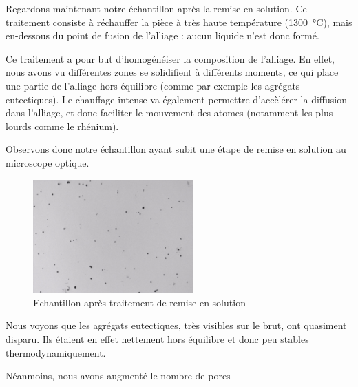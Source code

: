 Regardons maintenant notre échantillon après la remise en solution. 
Ce traitement consiste à réchauffer la pièce à très haute température (\SI{1300}{\celsius}),
mais en-dessous du point de fusion de l'alliage : aucun liquide n'est donc formé. 

Ce traitement a pour but d'homogénéiser la composition de l'alliage. En effet, nous avons 
vu différentes zones se solidifient à différents moments, ce qui place une partie de l'alliage
hors équilibre (comme par exemple les agrégats eutectiques). Le chauffage intense va également 
permettre d'accèlérer la diffusion dans l'alliage, et donc faciliter le mouvement des atomes 
(notamment les plus lourds comme le rhénium). 

Observons donc notre échantillon ayant subit une étape de remise en solution au microscope optique.

\begin{figure}[htbp]
    \centering
    \includegraphics[width=0.55\textwidth]{images_optique/res.pdf}
    \caption{Echantillon après traitement de remise en solution}
    \label{<label>}
\end{figure}

Nous voyons que les agrégats eutectiques, très visibles sur le brut, ont quasiment disparu.
Ils étaient en effet nettement hors équilibre et donc peu stables thermodynamiquement. 

Néanmoins, nous avons augmenté le nombre de pores 

